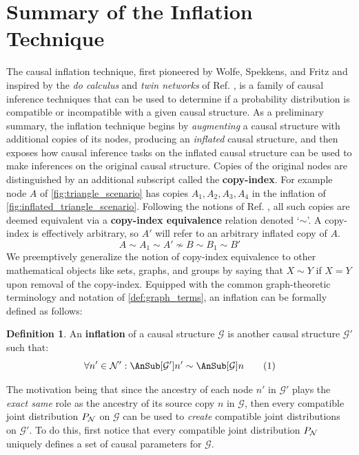 \documentclass[aps, 10pt, english, twoside, pra, nofootinbib, longbibliography]{revtex4-1}
\theoremstyle{plain}
\theoremstyle{definition}
\newtheorem{definition}[theorem]{Definition}
\theoremstyle{remark}
\newcommand{\graph}{\mathcal{G}}
\newcommand{\nodes}{\mathcal{N}}
\newcommand{\term}[1]{\textcolor{Mahogany}{\textbf{#1}}}
\begin{document}
    \section{Summary of the Inflation Technique}
    \label{sec:summary_inflation}
    The causal inflation technique, first pioneered by Wolfe, Spekkens, and Fritz \cite{Inflation} and inspired by the \textit{do calculus} and \textit{twin networks} of Ref. \cite{Pearl_2009}, is a family of causal inference techniques that can be used to determine if a probability distribution is compatible or incompatible with a given causal structure. As a preliminary summary, the inflation technique begins by \textit{augmenting} a causal structure with additional copies of its nodes, producing an \textit{inflated} causal structure, and then exposes how causal inference tasks on the inflated causal structure can be used to make inferences on the original causal structure. Copies of the original nodes are distinguished by an additional subscript called the \term{copy-index}. For example node $A$ of \cref{fig:triangle_scenario} has copies $A_1, A_2, A_3, A_4$ in the inflation of \cref{fig:inflated_triangle_scenario}. Following the notions of Ref. \cite{Inflation}, all such copies are deemed equivalent via a \term{copy-index equivalence} relation denoted `$\sim$'. A copy-index is effectively arbitrary, so $A'$ will refer to an arbitrary inflated copy of $A$.
    \[ A \sim A_1 \sim A' \not\sim B \sim B_1 \sim B' \]
    We preemptively generalize the notion of copy-index equivalence to other mathematical objects like sets, graphs, and groups by saying that $X \sim Y$ if $X = Y$ upon removal of the copy-index. Equipped with the common graph-theoretic terminology and notation of \cref{def:graph_terms}, an inflation can be formally defined as follows:
    \begin{definition}
        An \term{inflation} of a causal structure $\graph$ is another causal structure $\graph'$ such that:
        \[ \forall n' \in \nodes': \AnSub[\graph']{n'} \sim \AnSub[\graph]{n} \eq \label{eq:inflation_defn}\]
    \end{definition}
    The motivation being that since the ancestry of each node $n'$ in $\graph'$ plays the \textit{exact same} role as the ancestry of its source copy $n$ in $\graph$, then every compatible joint distribution $\prob[\nodes]$ on $\graph$ can be used to \textit{create} compatible joint distributions on $\graph'$. To do this, first notice that every compatible joint distribution $\prob[\nodes]$ uniquely defines a set of causal parameters for $\graph$.
\end{document}
